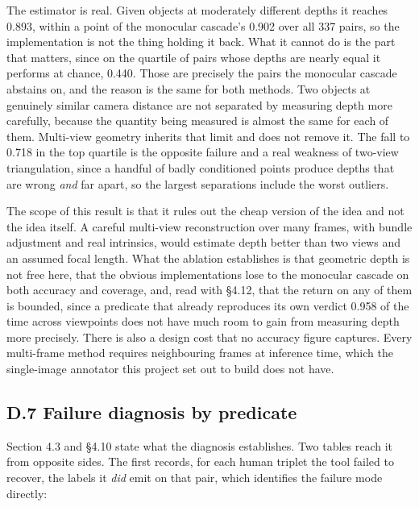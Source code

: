 The estimator is real. Given objects at moderately different depths it reaches 0.893, within a point of the monocular cascade's 0.902 over all 337 pairs, so the implementation is not the thing holding it back. What it cannot do is the part that matters, since on the quartile of pairs whose depths are nearly equal it performs at chance, 0.440. Those are precisely the pairs the monocular cascade abstains on, and the reason is the same for both methods. Two objects at genuinely similar camera distance are not separated by measuring depth more carefully, because the quantity being measured is almost the same for each of them. Multi-view geometry inherits that limit and does not remove it. The fall to 0.718 in the top quartile is the opposite failure and a real weakness of two-view triangulation, since a handful of badly conditioned points produce depths that are wrong \textit{and} far apart, so the largest separations include the worst outliers.

The scope of this result is that it rules out the cheap version of the idea and not the idea itself. A careful multi-view reconstruction over many frames, with bundle adjustment and real intrinsics, would estimate depth better than two views and an assumed focal length. What the ablation establishes is that geometric depth is not free here, that the obvious implementations lose to the monocular cascade on both accuracy and coverage, and, read with \S{}4.12, that the return on any of them is bounded, since a predicate that already reproduces its own verdict 0.958 of the time across viewpoints does not have much room to gain from measuring depth more precisely. There is also a design cost that no accuracy figure captures. Every multi-frame method requires neighbouring frames at inference time, which the single-image annotator this project set out to build does not have.

\subsection{D.7 Failure diagnosis by predicate}

Section 4.3 and \S{}4.10 state what the diagnosis establishes. Two tables reach it from opposite sides. The first records, for each human triplet the tool failed to recover, the labels it \textit{did} emit on that pair, which identifies the failure mode directly:

